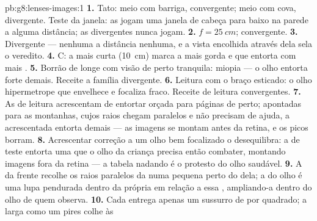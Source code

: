 \begin{solution}{pb:g8:lenses-images:1}
\textbf{1.} Tato: meio com barriga, convergente; meio com cova,
divergente. Teste da janela: as  jogam uma janela
de cabeça para baixo na parede a alguma distância; as divergentes
nunca jogam.
\textbf{2.} $f = \qty{25}{cm}$; convergente.
\textbf{3.} Divergente ---  nenhuma a distância nenhuma, e
a vista encolhida através dela sela o veredito.
\textbf{4.} C: a  mais curta (\qty{10}{cm}) marca a
 mais gorda e que entorta com mais .
\textbf{5.} Borrão de longe com visão de perto tranquila: miopia ---
o olho entorta forte demais. Receite a família divergente.
\textbf{6.} Leitura com o braço esticado: o olho hipermetrope que
envelhece e focaliza fraco. Receite  de leitura convergentes.
\textbf{7.} As  de leitura acrescentam  de entortar
orçada para páginas de perto; apontadas para as montanhas, cujos
raios chegam paralelos e não precisam de ajuda, a  acrescentada
entorta demais --- as imagens se montam antes da retina, e os picos
borram.
\textbf{8.} Acrescentar correção a um olho bem focalizado o
desequilibra: a  de teste entorta uma  que o olho da criança
precisa então combater, montando imagens fora da retina --- a tabela
nadando é o protesto do olho saudável.
\textbf{9.} A  da frente recolhe os raios paralelos da 
numa  pequena perto do  dela; a  do olho é uma
lupa pendurada dentro da própria  em relação a essa
, ampliando-a dentro do olho de quem observa.
\textbf{10.} Cada  entrega apenas um sussurro de  por
 quadrado; a  larga como um pires colhe  às

\end{solution}
